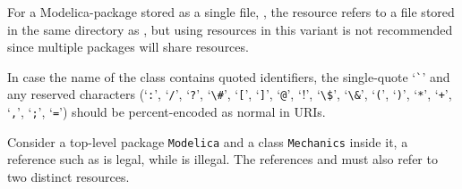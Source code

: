 For a Modelica-package stored as a single file, , the resource
 refers to a file  stored in the same
directory as , but using resources in this variant is not
recommended since multiple packages will share resources.

In case the name of the class contains quoted identifiers, the single-quote `\lstinline!`!'
and any reserved characters (`\lstinline!:!', `\lstinline!/!', `\lstinline!?!', `\lstinline!\#!', `\lstinline![!',
`\lstinline!]!', `\lstinline!@!', `\lstinline!!!', `\lstinline[mathescape=false]!\$!', `\lstinline!\&!', `\lstinline!(!', `\lstinline!)!', `\lstinline!*!', `\lstinline!+!',
`\lstinline!,!', `\lstinline!;!', `\lstinline!=!') should be percent-encoded as normal in URIs.

\begin{example}
Consider a top-level package \lstinline!Modelica! and a class
\lstinline!Mechanics! inside it, a reference such as
 is legal, while
 is illegal.
The references  and  must also refer to two distinct resources.
\end{example}
